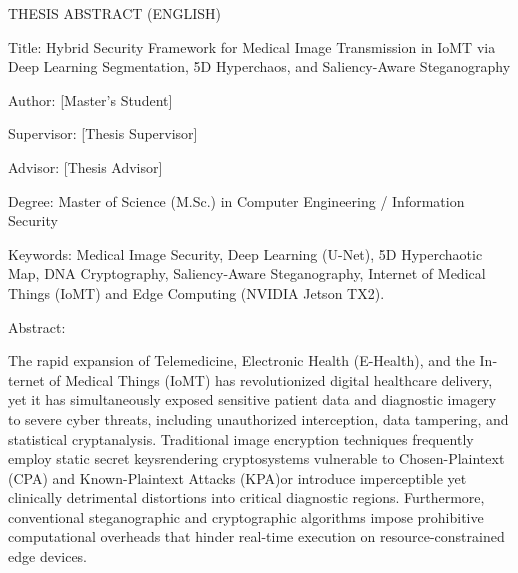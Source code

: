 \clearpage\begin{latin}
THESIS ABSTRACT (ENGLISH)\par



Title: Hybrid Security Framework for Medical Image Transmission in IoMT via Deep Learning Segmentation, 5D Hyperchaos, and Saliency{-}Aware Steganography\par



Author: [Master's Student]\par

Supervisor: [Thesis Supervisor]\par

Advisor: [Thesis Advisor]\par

Degree: Master of Science (M.Sc.) in Computer Engineering / Information Security\par

Keywords: Medical Image Security, Deep Learning (U{-}Net), 5D Hyperchaotic Map, DNA Cryptography, Saliency{-}Aware Steganography, Internet of Medical Things (IoMT) and Edge Computing (NVIDIA Jetson TX2).\par



Abstract:\par

The rapid expansion of Telemedicine, Electronic Health (E{-}Health), and the Internet of Medical Things (IoMT) has revolutionized digital healthcare delivery, yet it has simultaneously exposed sensitive patient data and diagnostic imagery to severe cyber threats, including unauthorized interception, data tampering, and statistical cryptanalysis. Traditional image encryption techniques frequently employ static secret keysrendering cryptosystems vulnerable to Chosen{-}Plaintext (CPA) and Known{-}Plaintext Attacks (KPA)or introduce imperceptible yet clinically detrimental distortions into critical diagnostic regions. Furthermore, conventional steganographic and cryptographic algorithms impose prohibitive computational overheads that hinder real{-}time execution on resource{-}constrained edge devices.\par


\end{latin}
